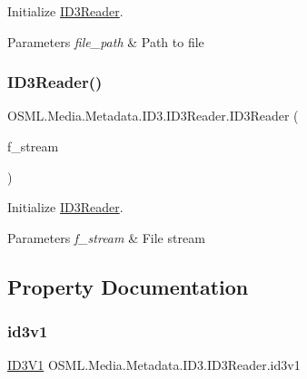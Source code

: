 Initialize \mbox{\hyperlink{classOSML_1_1Media_1_1Metadata_1_1ID3_1_1ID3Reader}{I\+D3\+Reader}}. 


\begin{DoxyParams}{Parameters}
{\em file\+\_\+path} & Path to file\\
\hline
\end{DoxyParams}
\mbox{\label{classOSML_1_1Media_1_1Metadata_1_1ID3_1_1ID3Reader_af6c98a7a0f2e7a8bc5f5906624abb116}} 
\subsubsection{\texorpdfstring{ID3Reader()}{ID3Reader()}\hspace{0.1cm}{\footnotesize\ttfamily [2/2]}}
{\footnotesize\ttfamily O\+S\+M\+L.\+Media.\+Metadata.\+I\+D3.\+I\+D3\+Reader.\+I\+D3\+Reader (\begin{DoxyParamCaption}\item[{File\+Stream}]{f\+\_\+stream }\end{DoxyParamCaption})\hspace{0.3cm}{\ttfamily [inline]}}



Initialize \mbox{\hyperlink{classOSML_1_1Media_1_1Metadata_1_1ID3_1_1ID3Reader}{I\+D3\+Reader}}. 


\begin{DoxyParams}{Parameters}
{\em f\+\_\+stream} & File stream\\
\hline
\end{DoxyParams}


\subsection{Property Documentation}
\mbox{\label{classOSML_1_1Media_1_1Metadata_1_1ID3_1_1ID3Reader_a957199760e0d1b56df9ae1df880c080c}} 
\subsubsection{\texorpdfstring{id3v1}{id3v1}}
{\footnotesize\ttfamily \mbox{\hyperlink{classOSML_1_1Media_1_1Metadata_1_1ID3_1_1ID3V1}{I\+D3\+V1}} O\+S\+M\+L.\+Media.\+Metadata.\+I\+D3.\+I\+D3\+Reader.\+id3v1\hspace{0.3cm}{\ttfamily [get]}}



